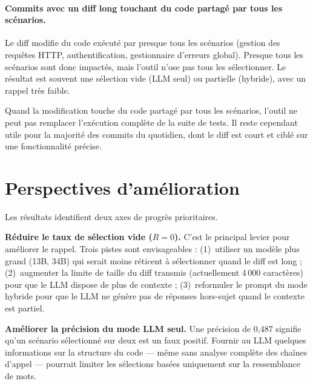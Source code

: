 \documentclass[12pt,a4paper]{article}
\begin{document}
\paragraph{Commits avec un diff long touchant du code partagé par tous les scénarios.}
Le diff modifie du code exécuté par presque tous les scénarios
(gestion des requêtes HTTP, authentification, gestionnaire d'erreurs global).
Presque tous les scénarios sont donc impactés, mais l'outil n'ose pas
tous les sélectionner. Le résultat est souvent une sélection vide
(LLM seul) ou partielle (hybride), avec un rappel très faible.

\begin{limite}
Quand la modification touche du code partagé par tous les scénarios,
l'outil ne peut pas remplacer l'exécution complète de la suite de tests.
Il reste cependant utile pour la majorité des commits du quotidien,
dont le diff est court et ciblé sur une fonctionnalité précise.
\end{limite}

\section{Perspectives d'amélioration}

Les résultats identifient deux axes de progrès prioritaires.

\textbf{Réduire le taux de sélection vide ($R = 0$).} C'est le principal
levier pour améliorer le rappel. Trois pistes sont envisageables :
(1)~utiliser un modèle plus grand (13B, 34B) qui serait moins réticent à
sélectionner quand le diff est long ; (2)~augmenter la limite de taille du
diff transmis (actuellement 4\,000 caractères) pour que le LLM dispose de
plus de contexte ; (3)~reformuler le prompt du mode hybride pour que le LLM
ne génère pas de réponses hors-sujet quand le contexte est partiel.

\textbf{Améliorer la précision du mode LLM seul.} Une précision de 0{,}487
signifie qu'un scénario sélectionné sur deux est un faux positif. Fournir
au LLM quelques informations sur la structure du code — même sans analyse
complète des chaînes d'appel — pourrait limiter les sélections basées
uniquement sur la ressemblance de mots.
\end{document}
